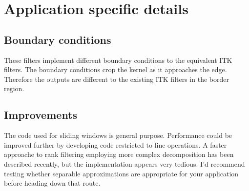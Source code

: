 \documentclass{InsightArticle}
\begin{document}
\section{Application specific details}
\subsection{Boundary conditions}
These filters implement different boundary conditions to the
equivalent ITK filters. The boundary conditions crop the kernel as it
approaches the edge. Therefore the outputs are different to the
existing ITK filters in the border region.

\subsection{Improvements}
The code used for sliding windows is general purpose. Performance
could be improved further by developing code restricted to line
operations. A faster approache to rank filtering employing more
complex decomposition has been described recently, but the
implementation appears very tedious. I'd recommend testing whether
separable approximations are appropriate for your application before
heading down that route.

\appendix





\nocite{ITKSoftwareGuide}
\end{document}
